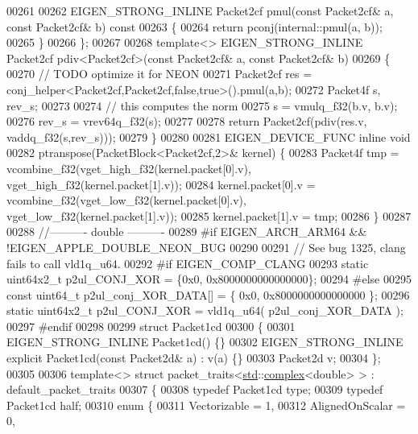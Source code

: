 \begin{DoxyCode}
00261 
00262   EIGEN\_STRONG\_INLINE Packet2cf pmul(\textcolor{keyword}{const} Packet2cf& a, \textcolor{keyword}{const} Packet2cf& b)\textcolor{keyword}{ const}
00263 \textcolor{keyword}{  }\{
00264     \textcolor{keywordflow}{return} pconj(internal::pmul(a, b));
00265   \}
00266 \};
00267 
00268 \textcolor{keyword}{template}<> EIGEN\_STRONG\_INLINE Packet2cf pdiv<Packet2cf>(\textcolor{keyword}{const} Packet2cf& a, \textcolor{keyword}{const} Packet2cf& b)
00269 \{
00270   \textcolor{comment}{// TODO optimize it for NEON}
00271   Packet2cf res = conj\_helper<Packet2cf,Packet2cf,false,true>().pmul(a,b);
00272   Packet4f s, rev\_s;
00273 
00274   \textcolor{comment}{// this computes the norm}
00275   s = vmulq\_f32(b.v, b.v);
00276   rev\_s = vrev64q\_f32(s);
00277 
00278   \textcolor{keywordflow}{return} Packet2cf(pdiv(res.v, vaddq\_f32(s,rev\_s)));
00279 \}
00280 
00281 EIGEN\_DEVICE\_FUNC \textcolor{keyword}{inline} \textcolor{keywordtype}{void}
00282 ptranspose(PacketBlock<Packet2cf,2>& kernel) \{
00283   Packet4f tmp = vcombine\_f32(vget\_high\_f32(kernel.packet[0].v), vget\_high\_f32(kernel.packet[1].v));
00284   kernel.packet[0].v = vcombine\_f32(vget\_low\_f32(kernel.packet[0].v), vget\_low\_f32(kernel.packet[1].v));
00285   kernel.packet[1].v = tmp;
00286 \}
00287 
00288 \textcolor{comment}{//---------- double ----------}
00289 \textcolor{preprocessor}{#if EIGEN\_ARCH\_ARM64 && !EIGEN\_APPLE\_DOUBLE\_NEON\_BUG}
00290 
00291 \textcolor{comment}{// See bug 1325, clang fails to call vld1q\_u64.}
00292 \textcolor{preprocessor}{#if EIGEN\_COMP\_CLANG}
00293   \textcolor{keyword}{static} uint64x2\_t p2ul\_CONJ\_XOR = \{0x0, 0x8000000000000000\};
00294 \textcolor{preprocessor}{#else}
00295   \textcolor{keyword}{const} uint64\_t  p2ul\_conj\_XOR\_DATA[] = \{ 0x0, 0x8000000000000000 \};
00296   \textcolor{keyword}{static} uint64x2\_t p2ul\_CONJ\_XOR = vld1q\_u64( p2ul\_conj\_XOR\_DATA );
00297 \textcolor{preprocessor}{#endif}
00298 
00299 \textcolor{keyword}{struct }Packet1cd
00300 \{
00301   EIGEN\_STRONG\_INLINE Packet1cd() \{\}
00302   EIGEN\_STRONG\_INLINE \textcolor{keyword}{explicit} Packet1cd(\textcolor{keyword}{const} Packet2d& a) : v(a) \{\}
00303   Packet2d v;
00304 \};
00305 
00306 \textcolor{keyword}{template}<> \textcolor{keyword}{struct }packet\_traits<\hyperlink{namespacestd}{std}::\hyperlink{structcomplex}{complex}<double> >  : default\_packet\_traits
00307 \{
00308   \textcolor{keyword}{typedef} Packet1cd type;
00309   \textcolor{keyword}{typedef} Packet1cd half;
00310   \textcolor{keyword}{enum} \{
00311     Vectorizable = 1,
00312     AlignedOnScalar = 0,

\end{DoxyCode}
